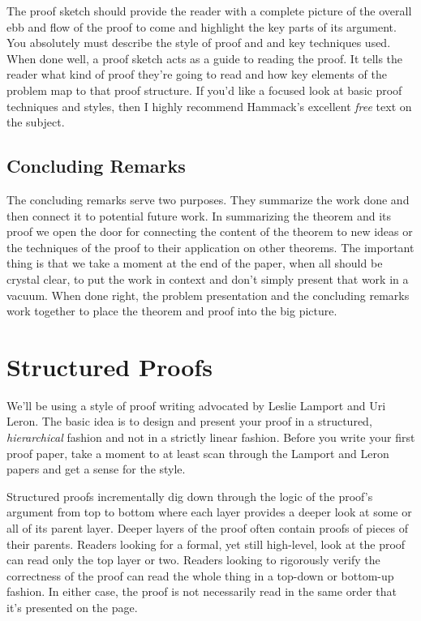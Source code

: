 \documentclass{tufte-handout}
\begin{document}
The proof sketch should provide the reader with a complete picture of the overall ebb and flow of the proof to come and highlight the key parts of its argument. You absolutely must describe the style of proof and and key techniques used.  When done well, a proof sketch acts as a guide to reading the proof. It tells the reader what kind of proof they're going to read and how key elements of the problem map to that proof structure. If you'd like a focused look at basic proof techniques and styles, then I highly recommend Hammack's excellent \textit{free} text on the subject\cite{Hammack2013}.

\subsection{ Concluding Remarks }

The concluding remarks serve two purposes. They summarize the work done and then connect it to potential future work. In summarizing the theorem and its proof we open the door for connecting the content of the theorem to new ideas or the techniques of the proof to their application on other theorems. The important thing is that we take a moment at the end of the paper, when all should be crystal clear, to put the work in context and don't simply present that work in a vacuum. When done right, the problem presentation and the concluding remarks work together to place the theorem and proof into the big picture.

\section{Structured Proofs}

We'll be using a style of proof writing advocated by Leslie Lamport\cite{Lamport2012,Lamport1993} and Uri Leron\cite{Leron1983}. The basic idea is to design and present your proof in a structured, \textit{hierarchical} fashion and not in a strictly linear fashion. Before you write your first proof paper, take a moment to at least scan through the Lamport and Leron papers and get a sense for the style.

Structured proofs incrementally dig down through the logic of the proof's argument from top to bottom where each layer provides a deeper look at some or all of its parent layer. Deeper layers of the proof often contain proofs of pieces of their parents. Readers looking for a formal, yet still high-level, look at the proof can read only the top layer or two.  Readers looking to rigorously verify the correctness of the proof can read the whole thing in a top-down or bottom-up fashion. In either case, the proof is not necessarily read in the same order that it's presented on the page.
\end{document}
